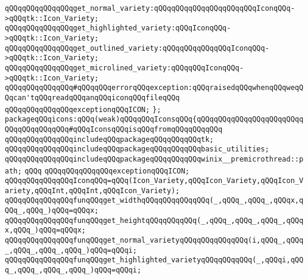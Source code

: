 \newline
\verb|qQQqqQQqqQQqqQQqget_normal_variety:qQQqqQQqqQQqqQQqqQQqqQQqIconqQQq->qQQqtk::Icon_Variety;|\newline
\verb|qQQqqQQqqQQqqQQqget_highlighted_variety:qQQqIconqQQq->qQQqtk::Icon_Variety;|\newline
\verb|qQQqqQQqqQQqqQQqget_outlined_variety:qQQqqQQqqQQqqQQqIconqQQq->qQQqtk::Icon_Variety;|\newline
\verb|qQQqqQQqqQQqqQQqget_microlined_variety:qQQqqQQqIconqQQq->qQQqtk::Icon_Variety;|\newline
\newline
\verb|qQQqqQQqqQQqqQQq#qQQqqQQqerrorqQQqexception:qQQqraisedqQQqwhenqQQqweqQQqcan'tqQQqreadqQQqanqQQqiconqQQqfileqQQq|\newline
\verb|qQQqqQQqqQQqqQQqexceptionqQQqICON;|\newline
\newline
\verb|};|\newline
\newline
\verb|packageqQQqicons:qQQq(weak)qQQqqQQqIconsqQQq{qQQqqQQqqQQqqQQqqQQqqQQqqQQqqQQqqQQqqQQq#qQQqIconsqQQqisqQQqfromqQQqqQQqqQQq|\newline
\newline
\verb|qQQqqQQqqQQqqQQqincludeqQQqpackageqQQqqQQqqQQqtk;|\newline
\verb|qQQqqQQqqQQqqQQqincludeqQQqpackageqQQqqQQqqQQqbasic_utilities;|\newline
\verb|qQQqqQQqqQQqqQQqincludeqQQqpackageqQQqqQQqqQQqwinix__premicrothread::path;|\newline
\verb|qQQq|\newline
\verb|qQQqqQQqqQQqqQQqexceptionqQQqICON;|\newline
\newline
\verb|qQQqqQQqqQQqqQQqIconqQQq=qQQq(Icon_Variety,qQQqIcon_Variety,qQQqIcon_Variety,qQQqInt,qQQqInt,qQQqIcon_Variety);|\newline
\newline
\verb|qQQqqQQqqQQqqQQqfunqQQqget_widthqQQqqQQqqQQqqQQq(_,qQQq_,qQQq_,qQQqx,qQQq_,qQQq_)qQQq=qQQqx;|\newline
\verb|qQQqqQQqqQQqqQQqfunqQQqget_heightqQQqqQQqqQQq(_,qQQq_,qQQq_,qQQq_,qQQqx,qQQq_)qQQq=qQQqx;|\newline
\verb|qQQqqQQqqQQqqQQqfunqQQqget_normal_varietyqQQqqQQqqQQqqQQq(i,qQQq_,qQQq_,qQQq_,qQQq_,qQQq_)qQQq=qQQqi;|\newline
\verb|qQQqqQQqqQQqqQQqfunqQQqget_highlighted_varietyqQQqqQQqqQQq(_,qQQqi,qQQq_,qQQq_,qQQq_,qQQq_)qQQq=qQQqi;|\newline
